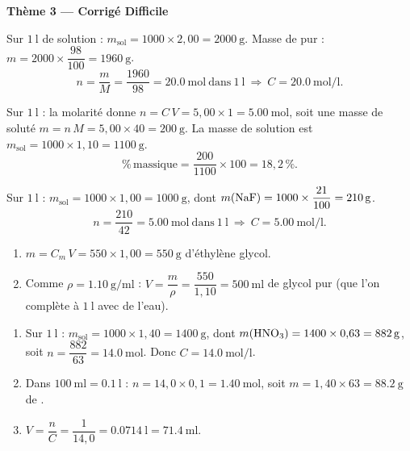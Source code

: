\documentclass[11pt,a4paper]{article}
\begin{document}
\begin{center}{\large\bfseries\color{primarydark} Thème 3 — Corrigé Difficile}\end{center}

\begin{corrige}
Sur $\SI{1}{\litre}$ de solution : $m_{\text{sol}} = 1000\times 2{,}00 = \SI{2000}{\gram}$.
Masse de  pur : $m = 2000\times\dfrac{98}{100} = \SI{1960}{\gram}$.
\[ n = \frac{m}{M} = \frac{1960}{98} = \SI{20.0}{\mole}\ \text{dans}\ \SI{1}{\litre}
   \ \Rightarrow\ \boxed{C = \SI{20.0}{\mole\per\litre}}. \]
\end{corrige}

\begin{corrige}
Sur $\SI{1}{\litre}$ : la molarité donne $n = C\,V = 5{,}00\times 1 = \SI{5.00}{\mole}$, soit une masse
de soluté $m = n\,M = 5{,}00\times 40 = \SI{200}{\gram}$. La masse de solution est
$m_{\text{sol}} = 1000\times 1{,}10 = \SI{1100}{\gram}$.
\[ \%\,\text{massique} = \frac{200}{1100}\times 100 = \boxed{18{,}2\,\%}. \]
\end{corrige}

\begin{corrige}
Sur $\SI{1}{\litre}$ : $m_{\text{sol}} = 1000\times 1{,}00 = \SI{1000}{\gram}$, dont
$m(\ce{NaF}) = 1000\times\dfrac{21}{100} = \SI{210}{\gram}$.
\[ n = \frac{210}{42} = \SI{5.00}{\mole}\ \text{dans}\ \SI{1}{\litre}
   \ \Rightarrow\ \boxed{C = \SI{5.00}{\mole\per\litre}}. \]
\end{corrige}

\begin{corrige}
\begin{enumerate}[label=\alph*)]
  \item $m = C_m\,V = 550\times 1{,}00 = \SI{550}{\gram}$ d'éthylène glycol.
  \item Comme $\rho = \SI{1.10}{\gram\per\milli\litre}$ : $V = \dfrac{m}{\rho} = \dfrac{550}{1{,}10} = \SI{500}{\milli\litre}$
        de glycol pur (que l'on complète à $\SI{1}{\litre}$ avec de l'eau).
\end{enumerate}
\end{corrige}

\begin{corrige}
\begin{enumerate}[label=\alph*)]
  \item Sur $\SI{1}{\litre}$ : $m_{\text{sol}} = 1000\times 1{,}40 = \SI{1400}{\gram}$, dont
        $m(\ce{HNO3}) = 1400\times 0{,}63 = \SI{882}{\gram}$, soit $n = \dfrac{882}{63} = \SI{14.0}{\mole}$.
        Donc $C = \SI{14.0}{\mole\per\litre}$.
  \item Dans $\SI{100}{\milli\litre} = \SI{0.1}{\litre}$ : $n = 14{,}0\times 0{,}1 = \SI{1.40}{\mole}$,
        soit $m = 1{,}40\times 63 = \SI{88.2}{\gram}$ de .
  \item $V = \dfrac{n}{C} = \dfrac{1}{14{,}0} = \SI{0.0714}{\litre} = \SI{71.4}{\milli\litre}$.
\end{enumerate}
\end{corrige}
\end{document}
